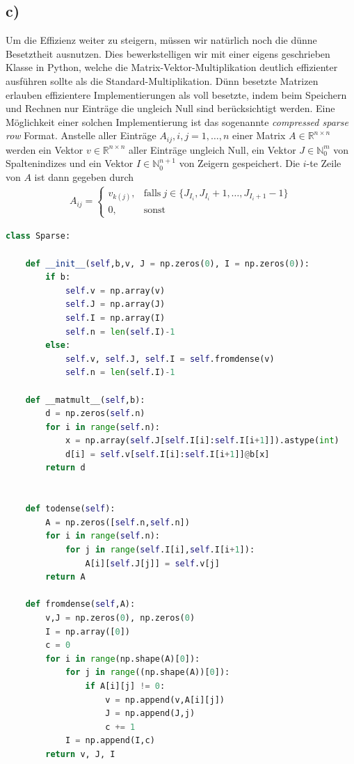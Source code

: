 \subsection*{c)}
Um die Effizienz weiter zu steigern, müssen wir natürlich noch die dünne Besetztheit ausnutzen.
Dies bewerkstelligen wir mit einer eigens geschrieben Klasse in Python, welche die Matrix-Vektor-Multiplikation
deutlich effizienter ausführen sollte als die Standard-Multiplikation.
Dünn besetzte Matrizen erlauben effizientere Implementierungen als voll besetzte, indem beim Speichern und Rechnen
nur Einträge die ungleich Null sind berücksichtigt werden. Eine Möglichkeit einer solchen Implementierung ist das sogenannte
\textit{compressed sparse row} Format. Anstelle aller Einträge $A_{ij}, i,j = 1,\dots,n$ einer Matrix $A \in \mathbb{R}^{n\times n}$
werden ein Vektor $v \in \mathbb{R}^{n\times n}$ aller Einträge ungleich Null, ein Vektor $J \in \mathbb{N}_0^m$ von Spaltenindizes
und ein Vektor $I \in \mathbb{N}_0^{n+1}$ von Zeigern gespeichert. Die $i$-te Zeile von $A$ ist dann gegeben durch
\begin{align*}
  A_{ij} = \begin{cases}
    v_{k(j)}, & \text{falls}~ j \in \{J_{I_i}, J_{I_i} + 1, \dots, J_{I_i + 1} - 1\} \\
    0, & \text{sonst}
  \end{cases}
\end{align*}
\begin{lstlisting}[language=Python]
class Sparse:

    def __init__(self,b,v, J = np.zeros(0), I = np.zeros(0)):
        if b:
            self.v = np.array(v)
            self.J = np.array(J)
            self.I = np.array(I)
            self.n = len(self.I)-1
        else:
            self.v, self.J, self.I = self.fromdense(v)
            self.n = len(self.I)-1

    def __matmult__(self,b):
        d = np.zeros(self.n)
        for i in range(self.n):
            x = np.array(self.J[self.I[i]:self.I[i+1]]).astype(int)
            d[i] = self.v[self.I[i]:self.I[i+1]]@b[x]
        return d


    def todense(self):
        A = np.zeros([self.n,self.n])
        for i in range(self.n):
            for j in range(self.I[i],self.I[i+1]):
                A[i][self.J[j]] = self.v[j]
        return A

    def fromdense(self,A):
        v,J = np.zeros(0), np.zeros(0)
        I = np.array([0])
        c = 0
        for i in range(np.shape(A)[0]):
            for j in range((np.shape(A))[0]):
                if A[i][j] != 0:
                    v = np.append(v,A[i][j])
                    J = np.append(J,j)
                    c += 1
            I = np.append(I,c)
        return v, J, I
\end{lstlisting}


